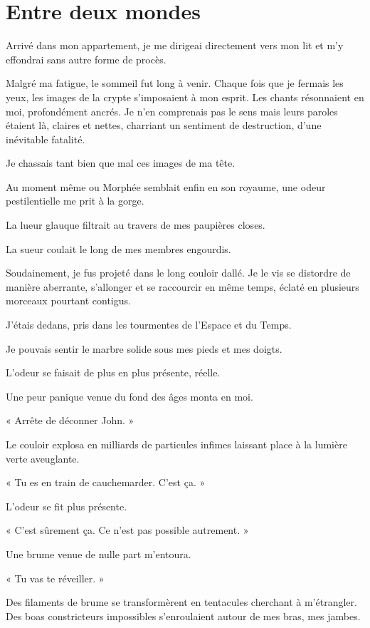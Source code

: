 \chapter[Entre deux mondes ]{Entre deux mondes}
Arrivé dans mon appartement, je me dirigeai directement vers mon lit et m'y effondrai sans autre forme de procès.

Malgré ma fatigue, le sommeil fut long à venir. Chaque fois que je fermais les yeux, les images de la crypte 
s'imposaient à mon esprit. Les chants résonnaient en moi, profondément ancrés. Je n'en comprenais pas le sens mais 
leurs paroles étaient là, claires et nettes, charriant un sentiment de destruction, d'une inévitable fatalité.

Je chassais tant bien que mal ces images de ma tête.

Au moment même ou Morphée semblait enfin en son royaume, une odeur pestilentielle me prit à la gorge.

La lueur glauque filtrait au travers de mes paupières closes. 

La sueur coulait le long de mes membres engourdis.

Soudainement, je fus projeté dans le long couloir dallé. Je le vis se distordre de manière aberrante, s'allonger et se 
raccourcir en même temps, éclaté en plusieurs morceaux pourtant contigus.

J'étais dedans, pris dans les tourmentes de l'Espace et du Temps.

Je pouvais sentir le marbre solide sous mes pieds et mes doigts.

L'odeur se faisait de plus en plus présente, réelle.

Une peur panique venue du fond des âges monta en moi.

« Arrête de déconner John. »

Le couloir explosa en milliards de particules infimes laissant place à la lumière verte aveuglante.

« Tu es en train de cauchemarder. C'est ça. »

L'odeur se fit plus présente.

« C'est sûrement ça. Ce n'est pas possible autrement. »

Une brume venue de nulle part m'entoura.

« Tu vas te réveiller. » 

Des filaments de brume se transformèrent en tentacules cherchant à m'étrangler. Des boas constricteurs impossibles 
s'enroulaient autour de mes bras, mes jambes.

